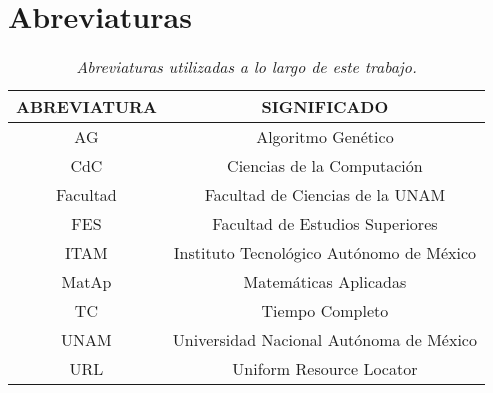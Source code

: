 \section{Abreviaturas}


\begin{table}[H]
\centering
\begin{tabular}{|c|c|}
\hline 
 \textbf{ABREVIATURA} & \textbf{SIGNIFICADO} \\ 
\hline 
 AG & Algoritmo Genético \\ 
\hline 
 CdC & Ciencias de la Computación \\ 
\hline 
 Facultad & Facultad de Ciencias de la UNAM \\ 
\hline 
 FES & Facultad de Estudios Superiores \\
\hline 
 ITAM & Instituto Tecnológico Autónomo de México \\ 
\hline 
 MatAp & Matemáticas Aplicadas \\ 
\hline 
 TC & Tiempo Completo \\ 
\hline 
 UNAM & Universidad Nacional Autónoma de México \\ 
\hline 
 URL & Uniform Resource Locator \\ 
\hline 
\end{tabular} 
\caption[\textit{Abreviaturas}]{\textit{Abreviaturas utilizadas a lo largo de este trabajo.}}
\end{table}
